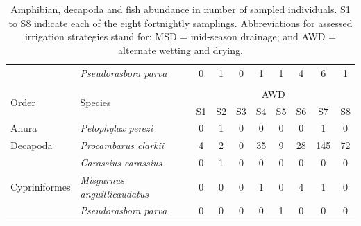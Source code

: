 \begin{table} [htbp]
\begin{tabular}{l | l | c c c c c c c c }
& \textit{Pseudorasbora parva} & 0 & 1 & 0 & 1 & 1 & 4 & 6 & 1\\
    \cline{1-10} 
\multicolumn{10}{c}{} \\
     \cline{1-10}
\multirow{2}{2.3cm}{Order} & \multirow{2}{3cm}{Species} & \multicolumn{8}{c}{AWD} \\
    \cline{3-10}
& & S1 & S2 & S3 & S4 & S5 & S6 & S7 & S8 \\
    \cline{1-10}
Anura & \textit{Pelophylax perezi} & 0 & 1 & 0 & 0 & 0 & 0 & 1 & 0\\
    \cline{1-10}
Decapoda & \textit{Procambarus clarkii} & 4 & 2 & 0 & 35 & 9 & 28 & 145 & 72\\
    \cline{1-10}
\multirow{3}{2.3cm}{Cypriniformes} & \textit{Carassius carassius} & 0 & 1 & 0 & 0 & 0 & 0 & 0 & 0\\
  & \textit{Misgurnus anguillicaudatus} & 0 & 0 & 0 & 1 & 0 & 4 & 1 & 0\\
& \textit{Pseudorasbora parva} & 0 & 0 & 0 & 0 & 1 & 0 & 0 & 0\\
\cline{1-10}
    \end{tabular}
    \caption{Amphibian, decapoda and fish abundance in number of sampled individuals. S1 to S8 indicate each of the eight fortnightly samplings. Abbreviations for assessed irrigation strategies stand for: MSD = mid-season drainage; and AWD = alternate wetting and drying.}
    \label{AbuMacroFauna}
\end{table}


